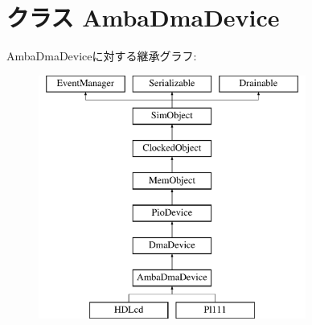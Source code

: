 \hypertarget{classRealView_1_1AmbaDmaDevice}{
\section{クラス AmbaDmaDevice}
\label{classRealView_1_1AmbaDmaDevice}
}
AmbaDmaDeviceに対する継承グラフ:\begin{figure}[H]
\begin{center}
\leavevmode
\includegraphics[height=8cm]{classRealView_1_1AmbaDmaDevice}
\end{center}
\end{figure}
